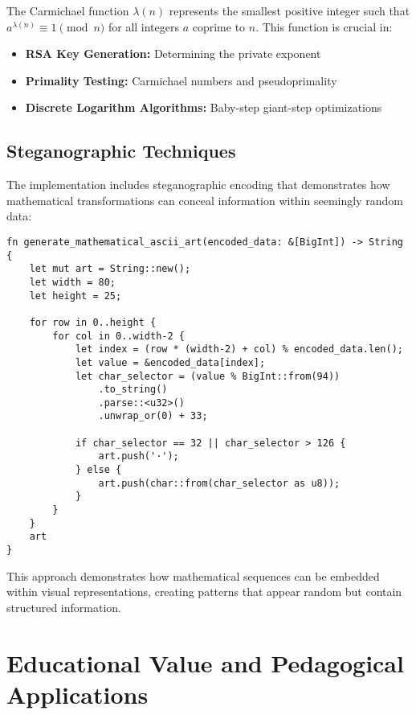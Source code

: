 \documentclass[12pt,a4paper]{article}
\begin{document}
The Carmichael function $\lambda(n)$ represents the smallest positive integer such that $a^{\lambda(n)} \equiv 1 \pmod{n}$ for all integers $a$ coprime to $n$. This function is crucial in:

\begin{itemize}
    \item \textbf{RSA Key Generation:} Determining the private exponent
    \item \textbf{Primality Testing:} Carmichael numbers and pseudoprimality
    \item \textbf{Discrete Logarithm Algorithms:} Baby-step giant-step optimizations
\end{itemize}

\subsection{Steganographic Techniques}

The implementation includes steganographic encoding that demonstrates how mathematical transformations can conceal information within seemingly random data:

\begin{lstlisting}[caption={Mathematical Steganography Implementation}]
fn generate_mathematical_ascii_art(encoded_data: &[BigInt]) -> String {
    let mut art = String::new();
    let width = 80;
    let height = 25;

    for row in 0..height {
        for col in 0..width-2 {
            let index = (row * (width-2) + col) % encoded_data.len();
            let value = &encoded_data[index];
            let char_selector = (value % BigInt::from(94))
                .to_string()
                .parse::<u32>()
                .unwrap_or(0) + 33;
            
            if char_selector == 32 || char_selector > 126 {
                art.push('·');
            } else {
                art.push(char::from(char_selector as u8));
            }
        }
    }
    art
}
\end{lstlisting}

This approach demonstrates how mathematical sequences can be embedded within visual representations, creating patterns that appear random but contain structured information.

\section{Educational Value and Pedagogical Applications}
\end{document}
